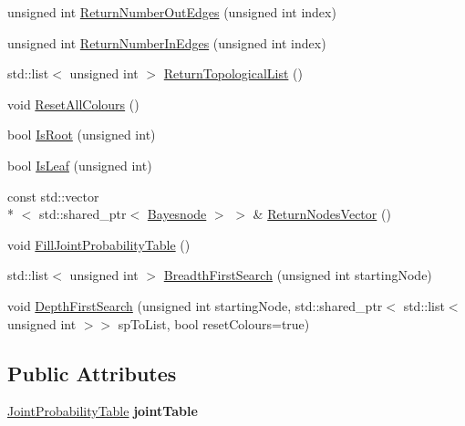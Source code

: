 \begin{DoxyCompactItemize}
\item 
unsigned int \hyperlink{classbayonet_1_1_bayesnet_aae9de07f181dc75f309b7f59e302a947}{Return\-Number\-Out\-Edges} (unsigned int index)
\item 
unsigned int \hyperlink{classbayonet_1_1_bayesnet_a7d47ce38f3882b80121f6acc351fd373}{Return\-Number\-In\-Edges} (unsigned int index)
\item 
std\-::list$<$ unsigned int $>$ \hyperlink{classbayonet_1_1_bayesnet_a3e8e924c33186e72bfa7d8ace1c211e6}{Return\-Topological\-List} ()
\item 
void \hyperlink{classbayonet_1_1_bayesnet_a2a934ac59da3a02720c40515b6b599e7}{Reset\-All\-Colours} ()
\item 
bool \hyperlink{classbayonet_1_1_bayesnet_a5877478cf225ed47f43df29cc087c5d6}{Is\-Root} (unsigned int)
\item 
bool \hyperlink{classbayonet_1_1_bayesnet_af9809dc12e3f77859f9674ced08fe7b0}{Is\-Leaf} (unsigned int)
\item 
const std\-::vector\\*
$<$ std\-::shared\-\_\-ptr$<$ \hyperlink{classbayonet_1_1_bayesnode}{Bayesnode} $>$ $>$ \& \hyperlink{classbayonet_1_1_bayesnet_ab0e31b9a2b625b5b59d3e70e3c7e4101}{Return\-Nodes\-Vector} ()
\item 
void \hyperlink{classbayonet_1_1_bayesnet_a586e4951a91ac2c47d8448caea25d657}{Fill\-Joint\-Probability\-Table} ()
\item 
std\-::list$<$ unsigned int $>$ \hyperlink{classbayonet_1_1_bayesnet_adef5210316c514cd50e977d5bc6292e5}{Breadth\-First\-Search} (unsigned int starting\-Node)
\item 
void \hyperlink{classbayonet_1_1_bayesnet_a8ab753ba22b35727cce998e2266b9afe}{Depth\-First\-Search} (unsigned int starting\-Node, std\-::shared\-\_\-ptr$<$ std\-::list$<$ unsigned int $>$$>$ sp\-To\-List, bool reset\-Colours=true)
\end{DoxyCompactItemize}
\subsection*{Public Attributes}
\begin{DoxyCompactItemize}
\item 
\hypertarget{classbayonet_1_1_bayesnet_ae162418e729b5c401f36ed1ef1d1b980}{\hyperlink{classbayonet_1_1_joint_probability_table}{Joint\-Probability\-Table} {\bfseries joint\-Table}}\label{classbayonet_1_1_bayesnet_ae162418e729b5c401f36ed1ef1d1b980}

\end{DoxyCompactItemize}


